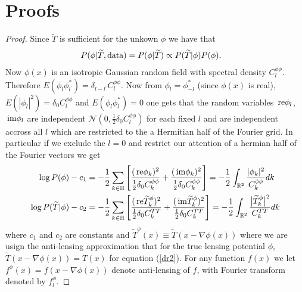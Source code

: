 \documentclass[noinfoline]{imsart}
\newcommand{\re}{\text{\,\rm re}}
\newcommand{\im}{\text{\,\rm im}}
\begin{document}
\section{Proofs}
\begin{proof}
Since $\tilde T$ is sufficient for the unkown $\phi$ we have that 
\begin{align*}
P(\phi|\widetilde T, \text{\rm data}) &= P(\phi|\widetilde T)\propto P(\widetilde T|\phi)P(\phi).
\end{align*}
Now $\phi(x)$ is an isotropic Gaussian random field with spectral density $C_l^{\phi\phi}$. 
Therefore $E(\phi_l \phi_{l^\prime}^*) = \delta_{l - l^\prime}C_l^{\phi\phi}$.  Now from $\phi_l = \phi_{-l}^*$ (since $\phi(x)$ is real), $E(|\phi_l|^2) = \delta_{0}C_l^{\phi\phi}$ and $E(\phi_l\phi_l^*) = 0 $ one gets that the random variables $\re \phi_l$, $\im \phi_l$ are independent $\mathcal N(0, \frac{1}{2}\delta_0 C_l^{\phi\phi})$ for each fixed $l$ and are independent accross all $l$ which are restricted to the a Hermitian half of the Fourier grid. In particular if we exclude the $l = 0$ and restrict our attention of a hermian half of the Fourier vectors we get
\begin{align}
\log P(\phi) - c_1 &=  - \frac{1}{2}\sum_{k \in \Bbb H}  \left[\frac{(\re \phi_k)^2}{\frac{1}{2}\delta_0 C_k^{\phi\phi}} +  \frac{(\im \phi_k)^2}{\frac{1}{2}\delta_0 C_k^{\phi\phi}} \right] = - \frac{1}{2}\int_{\Bbb R^2} \frac{|\phi_k|^2}{C_k^{\phi\phi}} dk \label{dr1} \\
\log P(\widetilde T| \phi) - c_2 &=  - \frac{1}{2}\sum_{k \in \Bbb H}  \left[\frac{(\re \widetilde T_k^\phi)^2}{\frac{1}{2}\delta_0 C_k^{TT}} +  \frac{(\im \widetilde T_k^\phi)^2}{\frac{1}{2}\delta_0 C_k^{TT}} \right] = - \frac{1}{2}\int_{\Bbb R^2} \frac{\bigl|\widetilde T_k^\phi\bigr|^2}{C_k^{TT}} dk \label{dr2}
\end{align}
where $c_1$ and $c_2$ are constants and  $\widetilde T^\phi(x)\equiv \widetilde T(x-\nabla \phi(x))$
where we are usign the  anti-lensing approximation that for the true lensing potential $\phi$,  $\widetilde T(x-\nabla\phi(x)) = T(x)$ for equation (\ref{dr2}). For any function $f(x)$ we let $f^\phi(x) = f(x-\nabla \phi(x))$ denote anti-lensing of $f$, with Fourier transform denoted by $f_l^\phi$. 

\end{proof}
\end{document}
